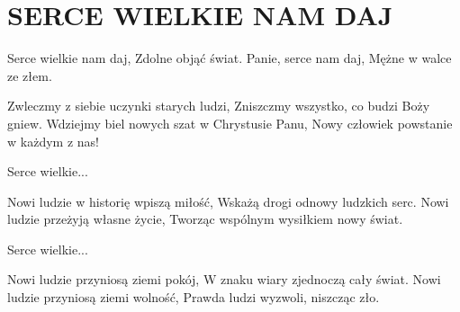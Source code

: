 \documentclass[../../../songbook.tex]{subfiles}
\begin{document}
\TabPositions{8cm} %
\section*{SERCE WIELKIE NAM DAJ}
{}
\vspace{0.5cm}
\-\hspace{1cm} Serce wielkie nam daj,		 \newline
\-\hspace{1cm} Zdolne objąć świat.		 \newline
\-\hspace{1cm} Panie, serce nam daj,		 \newline
\-\hspace{1cm} Mężne w walce ze złem.	 \newline

Zwleczmy z siebie uczynki starych ludzi,		 \newline
Zniszczmy wszystko, co budzi Boży gniew.		 \newline
Wdziejmy biel nowych szat w Chrystusie Panu,	 \newline
Nowy człowiek powstanie w każdym z nas!			 \newline

\-\hspace{1cm} Serce wielkie...			\newline

Nowi ludzie w historię wpiszą miłość,		\newline	
Wskażą drogi odnowy ludzkich serc.			\newline
Nowi ludzie przeżyją własne życie,			\newline	
Tworząc wspólnym wysiłkiem nowy świat.		\newline

\-\hspace{1cm} Serce wielkie...			\newline

Nowi ludzie przyniosą ziemi pokój,			\newline	
W znaku wiary zjednoczą cały świat.			\newline
Nowi ludzie przyniosą ziemi wolność,		\newline	
Prawda ludzi wyzwoli, niszcząc zło.				\newline
\end{document}
